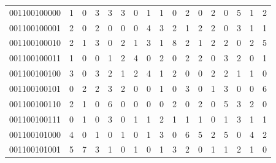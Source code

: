 \documentclass[10pt,a4paper]{article}
\begin{document}
\begin{longtable}{ |c|c|c|c|c|c|c|c|c|c|c|c|c|c|c|c|c| }
    001100100000              & 1                            & 0                                & 3                            & 3                              & 3   & 0   & 1   & 1   & 0   & 2   & 0   & 2   & 0   & 5   & 1   & 2   \\
    001100100001              & 2                            & 0                                & 2                            & 0                              & 0   & 0   & 4   & 3   & 2   & 1   & 2   & 2   & 0   & 3   & 1   & 1   \\
    001100100010              & 2                            & 1                                & 3                            & 0                              & 2   & 1   & 3   & 1   & 8   & 2   & 1   & 2   & 2   & 0   & 2   & 5   \\
    001100100011              & 1                            & 0                                & 0                            & 1                              & 2   & 4   & 0   & 2   & 0   & 2   & 2   & 0   & 3   & 2   & 0   & 1   \\
    001100100100              & 3                            & 0                                & 3                            & 2                              & 1   & 2   & 4   & 1   & 2   & 0   & 0   & 2   & 2   & 1   & 1   & 0   \\
    001100100101              & 0                            & 2                                & 2                            & 3                              & 2   & 0   & 0   & 1   & 0   & 3   & 0   & 1   & 3   & 0   & 0   & 6   \\
    001100100110              & 2                            & 1                                & 0                            & 6                              & 0   & 0   & 0   & 0   & 2   & 0   & 2   & 0   & 5   & 3   & 2   & 0   \\
    001100100111              & 0                            & 1                                & 0                            & 3                              & 0   & 1   & 1   & 2   & 1   & 1   & 1   & 0   & 1   & 3   & 1   & 1   \\
    001100101000              & 4                            & 0                                & 1                            & 0                              & 1   & 0   & 1   & 3   & 0   & 6   & 5   & 2   & 5   & 0   & 4   & 2   \\
    001100101001              & 5                            & 7                                & 3                            & 1                              & 0   & 1   & 0   & 1   & 3   & 2   & 0   & 1   & 1   & 2   & 1   & 0   \\

\end{longtable}
\end{document}
